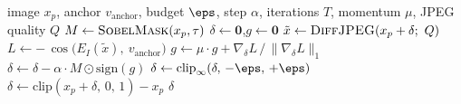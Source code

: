 \begin{algorithm}[t]
\caption{CoGEO inner loop (one of the four attack families in the anchor-decoupled evaluation pass).}
\label{alg:cogeo}
\small
\begin{algorithmic}[1]
\Require image $x_p$, anchor $v_{\mathrm{anchor}}$, budget $\eps$, step $\alpha$, iterations $T$, momentum $\mu$, JPEG quality $Q$
\State $M \gets \textsc{SobelMask}(x_p, \tau)$ 
\State $\delta \gets \mathbf{0}$,\quad $g \gets \mathbf{0}$
  \State $\tilde{x} \gets \textsc{DiffJPEG}(x_p + \delta;\ Q)$
  \State $L \gets -\,\cos\bigl(E_I(\tilde{x}),\ v_{\mathrm{anchor}}\bigr)$
  \State $g \gets \mu \cdot g + \nabla_{\delta} L\,/\,\lVert \nabla_{\delta} L\rVert_1$
  \State $\delta \gets \delta - \alpha \cdot M \odot \mathrm{sign}(g)$
  \State $\delta \gets \mathrm{clip}_\infty(\delta,\,-\eps,\,+\eps)$
  \State $\delta \gets \mathrm{clip}(x_p + \delta,\,0,\,1) - x_p$
\EndFor
\State \Return $\delta$
\end{algorithmic}
\end{algorithm}

